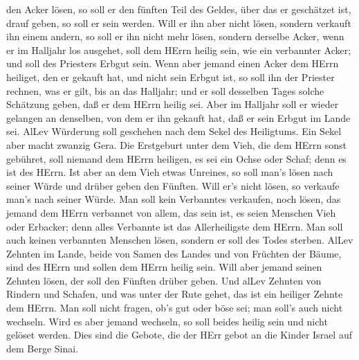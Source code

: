 den Acker lösen, so soll er den fünften Teil des Geldes, über das er
geschätzet ist, drauf geben, so soll er sein werden.  Will
er ihn aber nicht lösen, sondern verkauft ihn einem andern, so soll er
ihn nicht mehr lösen,  sondern derselbe Acker, wenn er im
Halljahr los ausgehet, soll dem HErrn heilig sein, wie ein verbannter
Acker; und soll des Priesters Erbgut sein.  Wenn aber
jemand einen Acker dem HErrn heiliget, den er gekauft hat, und nicht
sein Erbgut ist,  so soll ihn der Priester rechnen, was er
gilt, bis an das Halljahr; und er soll desselben Tages solche Schätzung
geben, daß er dem HErrn heilig sei.  Aber im Halljahr soll
er wieder gelangen an denselben, von dem er ihn gekauft hat, daß er sein
Erbgut im Lande sei.  AlLev Würderung soll geschehen nach
dem Sekel des Heiligtums. Ein Sekel aber macht zwanzig Gera.
 Die Erstgeburt unter dem Vieh, die dem HErrn sonst
gebühret, soll niemand dem HErrn heiligen, es sei ein Ochse oder Schaf;
denn es ist des HErrn.  Ist aber an dem Vieh etwas
Unreines, so soll man's lösen nach seiner Würde und drüber geben den
Fünften. Will er's nicht lösen, so verkaufe man's nach seiner Würde.
 Man soll kein Verbanntes verkaufen, noch lösen, das jemand
dem HErrn verbannet von allem, das sein ist, es seien Menschen Vieh oder
Erbacker; denn alles Verbannte ist das Allerheiligste dem HErrn.
 Man soll auch keinen verbannten Menschen lösen, sondern er
soll des Todes sterben.  AlLev Zehnten im Lande, beide von
Samen des Landes und von Früchten der Bäume, sind des HErrn und sollen
dem HErrn heilig sein.  Will aber jemand seinen Zehnten
lösen, der soll den Fünften drüber geben.  Und alLev
Zehnten von Rindern und Schafen, und was unter der Rute gehet, das ist
ein heiliger Zehnte dem HErrn.  Man soll nicht fragen, ob's
gut oder böse sei; man soll's auch nicht wechseln. Wird es aber jemand
wechseln, so soll beides heilig sein und nicht gelöset werden.
 Dies sind die Gebote, die der HErr gebot an die Kinder
Israel auf dem Berge Sinai.
